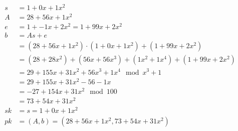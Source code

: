 \begin{align*}
  s  & = 1 + 0x + 1x^2                                                   \\
  A  & = 28 + 56x + 1x^2                                                 \\
  e  & = 1 + -1x + 2x^2= 1 + 99x + 2x^2                                  \\
  b  & = As + e                                                          \\
     & = (28 + 56x + 1x^2)\cdot(1 + 0x + 1x^2) + (1 + 99x + 2x^2)        \\
     & = (28 + 28x^2) + (56x + 56x^3) + (1x^2 + 1x^4) + (1 + 99x + 2x^2) \\
     & = 29 + 155x + 31x^2 + 56x^3 + 1x^4 \mod x^3+1                     \\
     & = 29 + 155x + 31x^2 - 56 - 1x                                     \\
     & = -27 + 154x + 31x^2  \mod 100                                    \\
     & = 73 + 54x + 31x^2                                                \\
  sk & = s =1 + 0x + 1x^2                                                \\
  pk & = (A, b) = (28 + 56x + 1x^2, 73 + 54x + 31x^2)                    \\
\end{align*}

